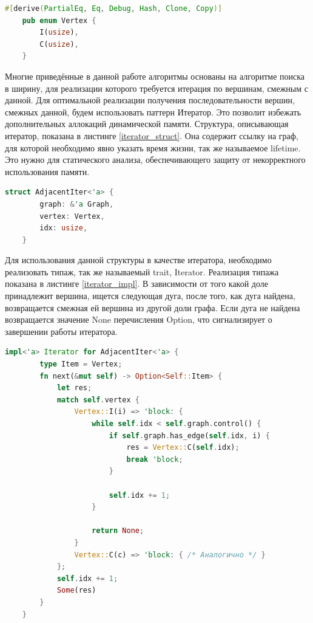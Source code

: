 \documentclass[14pt]{mmcs-article}
\begin{document}
\begin{lstlisting}[language=Rust, caption={ Перечисление, описывающее вершину графа. }, label=vertex_enum]
    #[derive(PartialEq, Eq, Debug, Hash, Clone, Copy)]
    pub enum Vertex {
        I(usize),
        C(usize),
    }
\end{lstlisting}

Многие приведённые в данной работе алгоритмы основаны на алгоритме поиска в ширину, для реализации которого требуется итерация по вершинам, смежным с данной. Для оптимальной реализации получения последовательности вершин, смежных данной, будем использовать паттерн Итератор. Это позволит избежать дополнительных аллокаций динамической памяти. Структура, описывающая итератор, показана в листинге \ref{iterator_struct}. Она содержит ссылку на граф, для которой необходимо явно указать время жизни, так же называемое lifetime. Это нужно для статического анализа, обеспечивающего защиту от некорректного использования памяти. 

\begin{lstlisting}[language=Rust, caption={ Структура, описывающая итератор по смежным вершинам. }, label=iterator_struct]
    struct AdjacentIter<'a> {
        graph: &'a Graph,
        vertex: Vertex,
        idx: usize,
    }
\end{lstlisting}

Для использования данной структуры в качестве итератора, необходимо реализовать типаж, так же называемый trait, Iterator. Реализация типажа показана в листинге \ref{iterator_impl}. В зависимости от того какой доле принадлежит вершина, ищется следующая дуга, после того, как дуга найдена, возвращается смежная ей вершина из другой доли графа. Если дуга не найдена возвращается значение None перечисления Option, что сигнализирует о завершении работы итератора. 

\begin{lstlisting}[language=Rust, caption={ Реализация типажа Iterator для структуры итератора по смежным вершинам. }, label=iterator_impl]
    impl<'a> Iterator for AdjacentIter<'a> {
        type Item = Vertex;
        fn next(&mut self) -> Option<Self::Item> {
            let res;
            match self.vertex {
                Vertex::I(i) => 'block: {
                    while self.idx < self.graph.control() {
                        if self.graph.has_edge(self.idx, i) {
                            res = Vertex::C(self.idx);
                            break 'block;
                        }

                        self.idx += 1;
                    }

                    return None;
                }
                Vertex::C(c) => 'block: { /* Аналогично */ }
            };
            self.idx += 1;
            Some(res)
        }
    }
\end{lstlisting}
\end{document}
